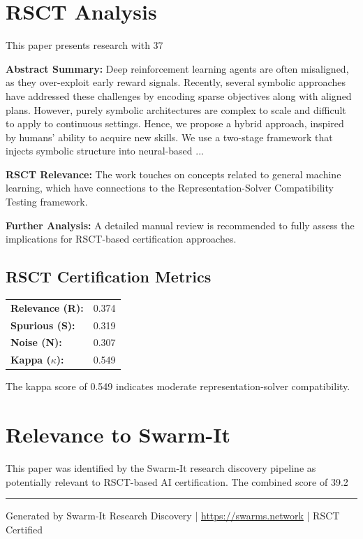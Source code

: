 \documentclass[11pt,a4paper]{article}
\begin{document}
\section{RSCT Analysis}
This paper presents research with 37%

\textbf{Abstract Summary:} Deep reinforcement learning agents are often misaligned, as they over-exploit early reward signals. Recently, several symbolic approaches have addressed these challenges by encoding sparse objectives along with aligned plans. However, purely symbolic architectures are complex to scale and difficult to apply to continuous settings. Hence, we propose a hybrid approach, inspired by humans' ability to acquire new skills. We use a two-stage framework that injects symbolic structure into neural-based ...

\textbf{RSCT Relevance:} The work touches on concepts related to general machine learning, which have connections to the Representation-Solver Compatibility Testing framework.

\textbf{Further Analysis:} A detailed manual review is recommended to fully assess the implications for RSCT-based certification approaches.


\subsection*{RSCT Certification Metrics}
\begin{tabular}{ll}
\textbf{Relevance (R):} & 0.374 \\
\textbf{Spurious (S):} & 0.319 \\
\textbf{Noise (N):} & 0.307 \\
\textbf{Kappa ($\kappa$):} & 0.549 \\
\end{tabular}

The kappa score of 0.549 indicates moderate representation-solver compatibility.


\section{Relevance to Swarm-It}
This paper was identified by the Swarm-It research discovery pipeline as potentially relevant to RSCT-based AI certification. The combined score of 39.2%

\vspace{1em}
\hrule
\vspace{0.5em}
\small{Generated by Swarm-It Research Discovery | \url{https://swarms.network} | RSCT Certified}
\end{document}
